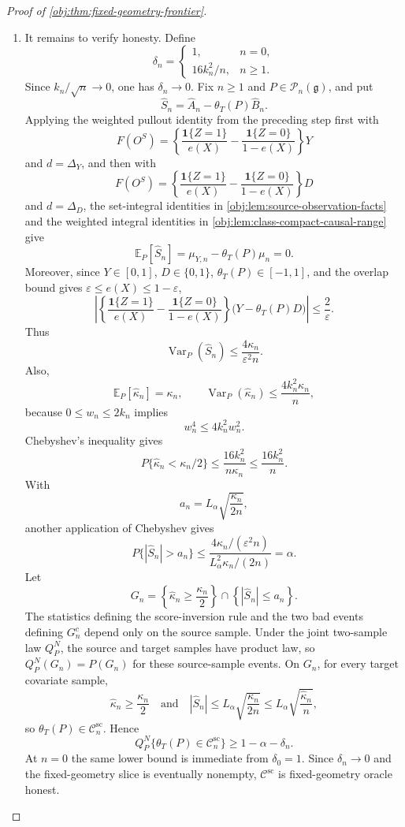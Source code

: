 \begin{proof}[Proof of \cref{obj:thm:fixed-geometry-frontier}]
\begin{enumerate}
\item It remains to verify honesty.  Define
\[
\delta_n=
\begin{cases}
1, & n=0,\\
16k_n^2/n, & n\ge1 .
\end{cases}
\]
Since \(k_n/\sqrt n\to0\), one has \(\delta_n\to0\).  Fix \(n\ge1\) and \(P\in\mathcal P_n(\mathfrak g)\), and put
\[
\widehat S_n
=
\widehat A_n-\theta_T(P)\widehat B_n .
\]
Applying the weighted pullout identity from the preceding step first with
\[
F(O^S)=
\left\{\frac{\mathbf 1\{Z=1\}}{e(X)}
-
\frac{\mathbf 1\{Z=0\}}{1-e(X)}
\right\}Y
\]
and \(d=\Delta_Y\), and then with
\[
F(O^S)=
\left\{\frac{\mathbf 1\{Z=1\}}{e(X)}
-
\frac{\mathbf 1\{Z=0\}}{1-e(X)}
\right\}D
\]
and \(d=\Delta_D\), the set-integral identities in \cref{obj:lem:source-observation-facts} and the weighted integral identities in \cref{obj:lem:class-compact-causal-range} give
\[
\mathbb E_P[\widehat S_n]
=
\mu_{Y,n}-\theta_T(P)\mu_n
=
0.
\]
Moreover, since \(Y\in[0,1]\), \(D\in\{0,1\}\), \(\theta_T(P)\in[-1,1]\), and the overlap bound gives \(\varepsilon\le e(X)\le1-\varepsilon\),
\[
\left|
\left\{\frac{\mathbf 1\{Z=1\}}{e(X)}
-
\frac{\mathbf 1\{Z=0\}}{1-e(X)}
\right\}
\bigl(Y-\theta_T(P)D\bigr)
\right|
\le
\frac{2}{\varepsilon}.
\]
Thus
\[
\operatorname{Var}_P(\widehat S_n)
\le
\frac{4\kappa_n}{\varepsilon^2 n}.
\]
Also,
\[
\mathbb E_P[\widehat\kappa_n]=\kappa_n,
\qquad
\operatorname{Var}_P(\widehat\kappa_n)
\le
\frac{4k_n^2\kappa_n}{n},
\]
because \(0\le w_n\le2k_n\) implies
\[
w_n^4\le 4k_n^2w_n^2 .
\]
Chebyshev's inequality gives
\[
P\{\widehat\kappa_n<\kappa_n/2\}
\le
\frac{16k_n^2}{n\kappa_n}
\le
\frac{16k_n^2}{n}.
\]
With
\[
a_n=L_\alpha\sqrt{\frac{\kappa_n}{2n}},
\]
another application of Chebyshev gives
\[
P\{|\widehat S_n|>a_n\}
\le
\frac{4\kappa_n/(\varepsilon^2 n)}
{L_\alpha^2\kappa_n/(2n)}
=
\alpha .
\]
Let
\[
G_n=
\left\{\widehat\kappa_n\ge\frac{\kappa_n}{2}\right\}
\cap
\left\{|\widehat S_n|\le a_n\right\}.
\]
The statistics defining the score-inversion rule and the two bad events defining \(G_n^c\) depend only on the source sample.  Under the joint two-sample law \(Q_P^N\), the source and target samples have product law, so \(Q_P^N(G_n)=P(G_n)\) for these source-sample events.  On \(G_n\), for every target covariate sample,
\[
\widehat\kappa_n\ge \frac{\kappa_n}{2}
\quad\text{and}\quad
|\widehat S_n|
\le
L_\alpha\sqrt{\frac{\kappa_n}{2n}}
\le
L_\alpha\sqrt{\frac{\widehat\kappa_n}{n}},
\]
so \(\theta_T(P)\in\mathscr C_n^{\mathrm{sc}}\).  Hence
\[
Q_P^N\{\theta_T(P)\in\mathscr C_n^{\mathrm{sc}}\}
\ge
1-\alpha-\delta_n .
\]
At \(n=0\) the same lower bound is immediate from \(\delta_0=1\).  Since \(\delta_n\to0\) and the fixed-geometry slice is eventually nonempty, \(\mathscr C^{\mathrm{sc}}\) is fixed-geometry oracle honest.


\end{enumerate}
\end{proof}
